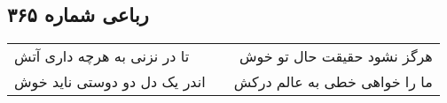 \begin{center}
\section*{رباعی شماره ۳۶۵}
\label{sec:sh365}
\begin{longtable}{l p{0.5cm} r}
تا در نزنی به هرچه داری آتش
&&
هرگز نشود حقیقت حال تو خوش
\\
اندر یک دل دو دوستی ناید خوش
&&
ما را خواهی خطی به عالم درکش
\\
\end{longtable}
\end{center}
